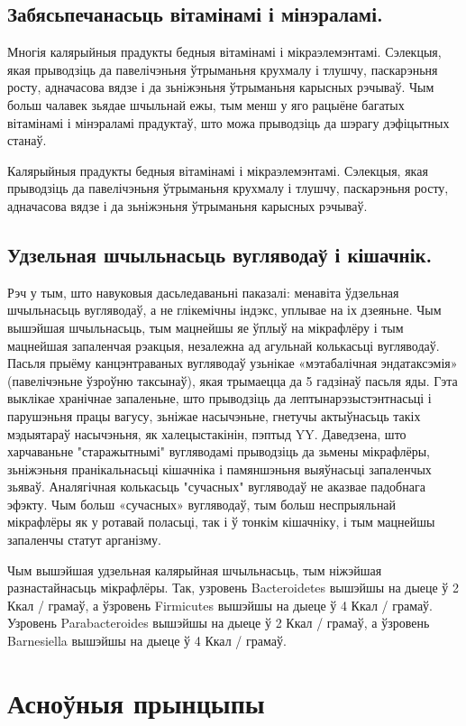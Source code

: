 \subsection{Забясьпечанасьць вітамінамі і мінэраламі.}
Многія калярыйныя прадукты бедныя вітамінамі і мікраэлемэнтамі. Сэлекцыя, якая прыводзіць да павелічэньня ўтрыманьня крухмалу і тлушчу, паскарэньня росту, адначасова вядзе і да зьніжэньня ўтрыманьня карысных рэчываў. Чым больш чалавек зьядае шчыльнай ежы, тым менш у яго рацыёне багатых вітамінамі і мінэраламі прадуктаў, што можа прыводзіць да шэрагу дэфіцытных станаў.

Калярыйныя прадукты бедныя вітамінамі і мікраэлемэнтамі. Сэлекцыя, якая прыводзіць да павелічэньня ўтрыманьня крухмалу і тлушчу, паскарэньня росту, адначасова вядзе і да зьніжэньня ўтрыманьня карысных рэчываў.

\subsection{Удзельная шчыльнасьць вугляводаў і кішачнік.}
Рэч у тым, што навуковыя дасьледаваньні паказалі: менавіта ўдзельная шчыльнасьць вугляводаў, а не глікемічны індэкс, уплывае на іх дзеяньне. Чым вышэйшая шчыльнасьць, тым мацнейшы яе ўплыў на мікрафлёру і тым мацнейшая запаленчая рэакцыя, незалежна ад агульнай колькасьці вугляводаў. Пасьля прыёму канцэнтраваных вугляводаў узьнікае «мэтабалічная эндатаксэмія» (павелічэньне ўзроўню таксынаў), якая трымаецца да 5 гадзінаў пасьля яды. Гэта выклікае хранічнае запаленьне, што прыводзіць да лептынарэзыстэнтнасьці і парушэньня працы вагусу, зьніжае насычэньне, гнетучы актыўнасьць такіх мэдыятараў насычэньня, як халецыстакінін, пэптыд YY. Даведзена, што харчаваньне "старажытнымі" вугляводамі прыводзіць да зьмены мікрафлёры, зьніжэньня пранікальнасьці кішачніка і памяншэньня выяўнасьці запаленчых зьяваў. Аналягічная колькасьць "сучасных" вугляводаў не аказвае падобнага эфэкту. Чым больш «сучасных» вугляводаў, тым больш неспрыяльнай мікрафлёры як у ротавай поласьці, так і ў тонкім кішачніку, і тым мацнейшы запаленчы статут арганізму.

Чым вышэйшая удзельная калярыйная шчыльнасьць, тым ніжэйшая разнастайнасьць мікрафлёры. Так, узровень Bacteroidetes вышэйшы на дыеце ў 2 Ккал / грамаў, а ўзровень Firmicutes вышэйшы на дыеце ў 4 Ккал / грамаў. Узровень Parabacteroides вышэйшы на дыеце ў 2 Ккал / грамаў, а ўзровень Barnesiella вышэйшы на дыеце ў 4 Ккал / грамаў.

\section{Асноўныя прынцыпы}

